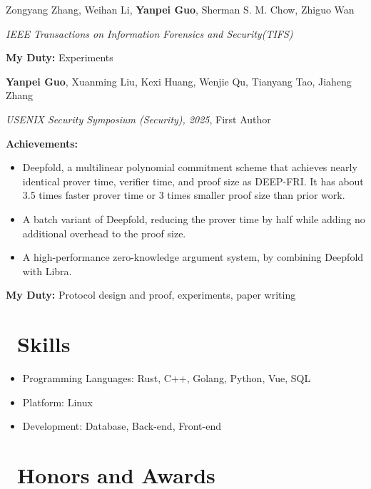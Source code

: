 \documentclass{resume}
\begin{document}
Zongyang Zhang, Weihan Li, \textbf{Yanpei Guo}, Sherman S. M. Chow, Zhiguo Wan

\textit{IEEE Transactions on Information Forensics and Security(TIFS)}

\textbf{My Duty:} Experiments

\textbf{Yanpei Guo}, Xuanming Liu, Kexi Huang, Wenjie Qu, Tianyang Tao, Jiaheng Zhang

\textit{USENIX Security Symposium (Security), 2025}, First Author

\textbf{Achievements:}
\begin{itemize}
  \item Deepfold, a multilinear polynomial commitment scheme that achieves nearly identical prover time, verifier time, and proof size as DEEP-FRI.
  It has about 3.5 times faster prover time or 3 times smaller proof size than prior work.
  \item A batch variant of Deepfold, reducing the prover time by half while adding no additional overhead to the proof size.
  \item A high-performance zero-knowledge argument system, by combining Deepfold with Libra.
\end{itemize}
\textbf{My Duty:} Protocol design and proof, experiments, paper writing


\section{\faCogs\ Skills}
\begin{itemize}[parsep=0.5ex]
  \item Programming Languages: Rust, C++, Golang, Python, Vue, SQL
  \item Platform: Linux
  \item Development: Database, Back-end, Front-end
\end{itemize}

\section{\faTrophy\ Honors and Awards}
\end{document}
